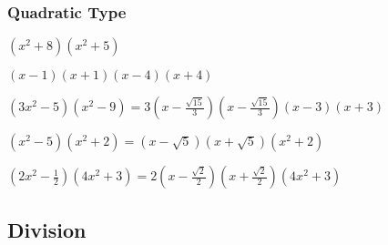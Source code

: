 \documentclass[12pt]{book}
\theoremstyle{definition}
\begin{document}
\subsubsection{Quadratic Type}
\begin{oddenumerate}
  \item  %
$(x^2+8)(x^2+5)$
  \item  %
$(x-1)(x+1)(x-4)(x+4)$
  \item  %
$(3x^2-5)(x^2-9)=3(x-\frac{\sqrt{15}}{3})(x-\frac{\sqrt{15}}{3})(x-3)(x+3)$
  \item  %
$(x^2-5)(x^2+2)=(x-\sqrt{5})(x+\sqrt{5})(x^2+2)$
  \item  %
$(2x^2-\frac{1}{2})(4x^2+3)=2(x-\frac{\sqrt{2}}{2})(x+\frac{\sqrt{2}}{2})(4x^2+3)$
\end{oddenumerate}
\subsection*{Division}
\end{document}
